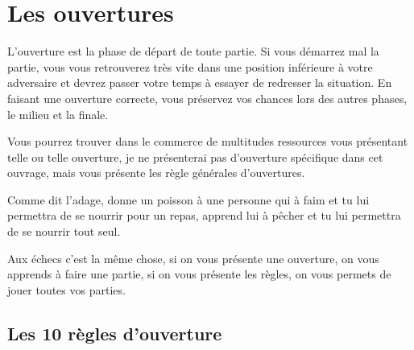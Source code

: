 \documentclass[a5paper,openany,twocolumn]{book}%
\begin{document}
\section{Les ouvertures}

L'ouverture est la phase de départ de toute partie. Si vous démarrez mal la partie, vous vous retrouverez très vite dans une position inférieure à votre adversaire et devrez passer votre temps à essayer de redresser la situation. En faisant une ouverture correcte, vous préservez vos chances lors des autres phases, le milieu et la finale.

Vous pourrez trouver dans le commerce de multitudes ressources vous présentant telle ou telle ouverture, je ne présenterai pas d'ouverture spécifique dans cet ouvrage, mais vous présente les règle générales d'ouvertures. 

Comme dit l'adage, donne un poisson à une personne qui à faim et tu lui permettra de se nourrir pour un repas, apprend lui à pêcher et tu lui permettra de se nourrir tout seul.

Aux échecs c'est la même chose, si on vous présente une ouverture, on vous apprends à faire une partie, si on vous présente les règles, on vous permets de jouer toutes vos parties. 

\subsection{Les 10 règles d'ouverture}

\medskip
\end{document}
